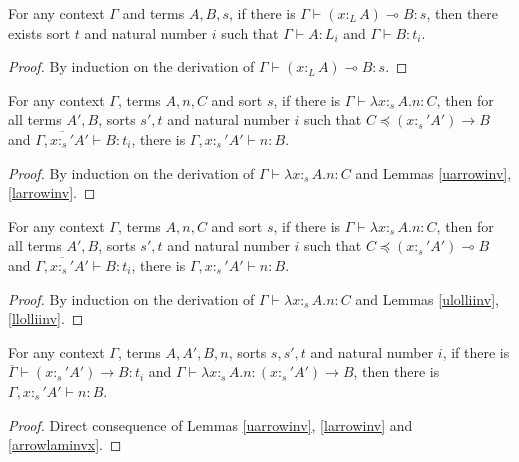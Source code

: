\documentclass[sigplan,screen,review,anonymous]{acmart}
\newcommand{\ltype}{:_{\scriptscriptstyle L}}
\newcommand{\stype}[1]{:_#1}
\begin{document}
\begin{lemma}\label{llolliinv}
  For any context $\Gamma$ and terms $A, B, s$, if there is $\Gamma \vdash (x \ltype A)\multimap B : s$, then there exists sort $t$ and natural number $i$ such that $\Gamma \vdash A : L_i$ and $\Gamma \vdash B : t_i$.
\end{lemma}
\begin{proof}
  By induction on the derivation of $\Gamma \vdash (x \ltype A) \multimap B : s$.
\end{proof}

\begin{lemma}\label{arrowlaminvx}
  For any context $\Gamma$, terms $A, n, C$ and sort $s$, if there is $\Gamma \vdash \lambda x \stype{s} A . n : C$, then for all terms $A', B$, sorts $s', t$ and natural number $i$ such that $C \preceq (x \stype{s'} A') \rightarrow B$ and $\overline{\Gamma, x \stype{s'} A'} \vdash B : t_i$, there is $\Gamma, x \stype{s'} A' \vdash n : B$.
\end{lemma}
\begin{proof}
  By induction on the derivation of $\Gamma \vdash \lambda x \stype{s} A . n : C$ and Lemmas \ref{uarrowinv}, \ref{larrowinv}.
\end{proof}

\begin{lemma}\label{lollilaminvx}
  For any context $\Gamma$, terms $A, n, C$ and sort $s$, if there is $\Gamma \vdash \lambda x \stype{s} A . n : C$, then for all terms $A', B$, sorts $s', t$ and natural number $i$ such that $C \preceq (x \stype{s'} A') \multimap B$ and $\overline{\Gamma, x \stype{s'} A'} \vdash B : t_i$, there is $\Gamma, x \stype{s'} A' \vdash n : B$.
\end{lemma}
\begin{proof}
  By induction on the derivation of $\Gamma \vdash \lambda x \stype{s} A . n : C$ and Lemmas \ref{ulolliinv}, \ref{llolliinv}.
\end{proof}

\begin{lemma}\label{arrowlaminv}
  For any context $\Gamma$, terms $A, A', B, n$, sorts $s, s', t$ and natural number $i$, if there is $\overline{\Gamma} \vdash (x \stype{s'} A') \rightarrow B : t_i$ and $\Gamma \vdash \lambda x \stype{s} A . n : (x \stype{s'} A') \rightarrow B$, then there is $\Gamma, x \stype{s'} A' \vdash n : B$.
\end{lemma}
\begin{proof}
  Direct consequence of Lemmas \ref{uarrowinv}, \ref{larrowinv} and \ref{arrowlaminvx}.
\end{proof}
\end{document}

